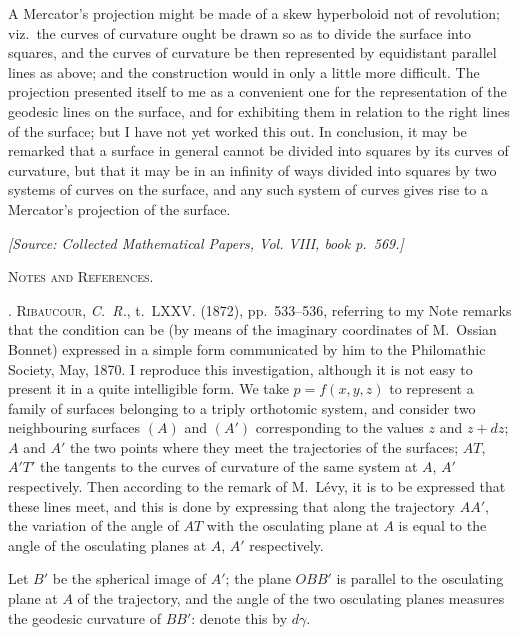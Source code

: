 \documentclass[11pt,a4paper]{article}
\theoremstyle{plain}
\theoremstyle{definition}
\newcommand{\sourcepage}[1]{%
  \par\noindent\textit{[Source: Collected Mathematical Papers, Vol. VIII, book p.~#1.]}\par\medskip
}
\begin{document}
\bigskip

A Mercator's projection might be made of a skew hyperboloid not of revolution;
viz.\ the curves of curvature ought be drawn so as to divide the surface into squares,
and the curves of curvature be then represented by equidistant parallel lines as above;
and the construction would in only a little more difficult.  The projection presented
itself to me as a convenient one for the representation of the geodesic lines on the
surface, and for exhibiting them in relation to the right lines of the surface; but I
have not yet worked this out.  In conclusion, it may be remarked that a surface in
general cannot be divided into squares by its curves of curvature, but that it may
be in an infinity of ways divided into squares by two systems of curves on the
surface, and any such system of curves gives rise to a Mercator's projection of the
surface.

\clearpage


\sourcepage{569}

\begin{center}
  {\Large\scshape Notes and References.}
\end{center}

. \textsc{Ribaucour}, \textit{C.~R.}, t.~\textsc{LXXV}. (1872), pp.~533--536, referring to my Note remarks
that the condition can be (by means of the imaginary coordinates of M.~Ossian Bonnet)
expressed in a simple form communicated by him to the Philomathic Society, May,
1870. I reproduce this investigation, although it is not easy to present it in a quite
intelligible form. We take $p=f(x,y,z)$ to represent a family of surfaces belonging to
a triply orthotomic system, and consider two neighbouring surfaces $(A)$ and $(A')$ corresponding
to the values $z$ and $z+dz$; $A$ and $A'$ the two points where they meet the
trajectories of the surfaces; $AT$, $A'T'$ the tangents to the curves of curvature of the
same system at $A$, $A'$ respectively. Then according to the remark of M.~L\'evy, it is
to be expressed that these lines meet, and this is done by expressing that along the
trajectory $AA'$, the variation of the angle of $AT$ with the osculating plane at $A$ is
equal to the angle of the osculating planes at $A$, $A'$ respectively.

Let $B'$ be the spherical image of $A'$; the plane $OBB'$ is parallel to the osculating
plane at $A$ of the trajectory, and the angle of the two osculating planes measures
the geodesic curvature of $BB'$: denote this by $d\gamma$.
\end{document}
